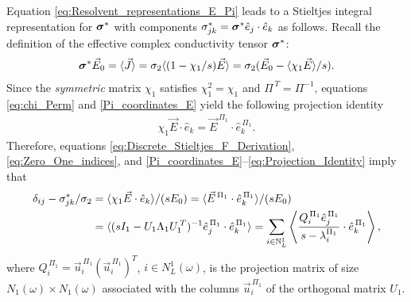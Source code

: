 \documentclass{cmslatex}
\newcommand\bsig{\mbox{\boldmath${\sigma}$}}
\begin{document}
Equation \eqref{eq:Resolvent_representations_E_Pi} leads to a
Stieltjes integral representation for $\bsig^*$ with components
$\sigma^*_{jk}=\bsig^*\hat{e}_j\cdot\hat{e}_k$ as follows. Recall the
definition of the effective complex conductivity tensor $\bsig^*$:
%
\begin{align}\label{eq:Eff_Cond_Tens_Def}
  \bsig^*\vec{E}_0=\langle\vec{J}\rangle 
                =\sigma_2\langle(1-\chi_1/s)\vec{E}\rangle
                =\sigma_2(\vec{E}_0 -\langle\chi_1\vec{E}\rangle/s).
\end{align}
%
Since the \emph{symmetric} matrix $\chi_1$ satisfies $\chi_1^2=\chi_1$ and
$\Pi^{\,T}=\Pi^{-1}$, equations \eqref{eq:chi_Perm} and
\eqref{Pi_coordinates_E} yield the following projection identity  
%
\begin{align}\label{eq:Projection_Identity}
 \chi_1\vec{E}\cdot\hat{e}_k=\vec{E}^{\,\Pi_1}\cdot\hat{e}_k^{\,\Pi_1}.
\end{align}
%
Therefore, equations \eqref{eq:Discrete_Stieltjes_F_Derivation},
\eqref{eq:Zero_One_indices}, and
\eqref{Pi_coordinates_E}--\eqref{eq:Projection_Identity} 
imply that  
%
\begin{align}\label{eq:Disc_Stieltjes_Rep_Sigma}
  \delta_{ij}-\sigma^*_{jk}/\sigma_2&=\langle\chi_1\vec{E}\cdot\hat{e}_k\rangle/(sE_0)
          =\langle\vec{E}^{\,\Pi_1}\cdot\hat{e}_k^{\,\Pi_1}\rangle/(sE_0)
          \notag\\
          &=\langle(sI_1-U_1\Lambda_1U_1^{\,T})^{-1}\hat{e}_j^{\,\Pi_1}\cdot\hat{e}_k^{\,\Pi_1}\rangle          
          =\sum_{i\in\mathbb{N}_L^1}\left\langle
          \frac{Q_i^{\,\Pi_1}\hat{e}_j^{\,\Pi_1}}{s-\lambda_i^{\Pi_1}}\cdot\hat{e}_k^{\,\Pi_1}
          \right\rangle,  
\end{align}
%
where $Q_i^{\,\Pi_1}=\vec{u}_i^{\,\Pi_1}(\vec{u}_i^{\,\Pi_1})^T$,
$i\in N_L^1(\omega)$, is the projection matrix of size $N_1(\omega)\times N_1(\omega)$
associated with the columns $\vec{u}_i^{\,\Pi_1}$ of the orthogonal
matrix $U_1$.  
\end{document}
